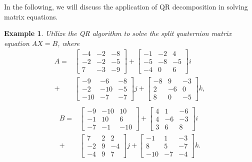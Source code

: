 \documentclass[conference]{IEEEtran}
\newtheorem{example}[theorem]{Example}
\numberwithin{equation}{section}
\begin{document}
In the following, we will discuss the application of QR decomposition in solving matrix equations.
\begin{example}
Utilize the QR algorithm to solve the split quaternion matrix equation $AX = B$, where
\begin{align*}
  A =
    &\begin{bmatrix}
    -4 & -2 & -8 \\
    -2 & -2 & -5 \\
     7 & -3 & -9
    \end{bmatrix} +
    \begin{bmatrix}
    -1 & -2 &  4 \\
    -5 & -8 & -5 \\
    -4 &  0 &  6
    \end{bmatrix} i \\
    + 
    &\begin{bmatrix}
    -9  & -6  & -8 \\
    -2  & -10 & -5 \\
    -10 & -7  & -7
    \end{bmatrix} j +
    \begin{bmatrix}
    -8 &  9 & -3 \\
     2 & -6 &  0 \\
     8 &  0 & -5
    \end{bmatrix} k,\\
\end{align*}
\begin{align*}
  B =
    &\begin{bmatrix}
    -9 & -10 &  10 \\
    -1 &  10 &  6 \\
    -7 & -1  & -10
    \end{bmatrix} +
    \begin{bmatrix}
    4 &  1 & -6 \\
    4 & -6 & -3 \\
    3 &  6 &  8
    \end{bmatrix} i \\
    +
    &\begin{bmatrix}
     7 & 2 &  2 \\
    -2 & 9 & -4 \\
    -4 & 9 &  7
    \end{bmatrix} j +
    \begin{bmatrix}
    -1 &   1 & -3 \\
     8 &   5 & -7 \\
    -10 & -7 & -4
    \end{bmatrix} k.
\end{align*}
\end{example}  
\end{document}
